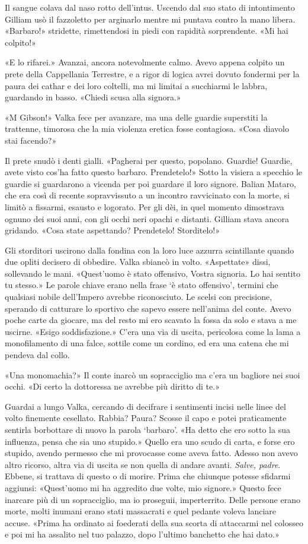 Il sangue colava dal naso rotto dell'intus. Uscendo dal suo stato di
intontimento Gilliam usò il fazzoletto per arginarlo mentre mi puntava
contro la mano libera. «Barbaro!» stridette, rimettendosi in piedi con
rapidità sorprendente. «Mi hai colpito!»

«E lo rifarei.» Avanzai, ancora notevolmente calmo. Avevo appena colpito
un prete della Cappellania Terrestre, e a rigor di logica avrei dovuto
fondermi per la paura dei cathar e dei loro coltelli, ma mi limitai a
succhiarmi le labbra, guardando in basso. «Chiedi scusa alla signora.»

«M Gibson!» Valka fece per avanzare, ma una delle guardie superstiti la
trattenne, timorosa che la mia violenza eretica fosse contagiosa. «Cosa
diavolo stai facendo?»

Il prete snudò i denti gialli. «Pagherai per questo, popolano. Guardie!
Guardie, avete visto cos'ha fatto questo barbaro. Prendetelo!» Sotto la
visiera a specchio le guardie si guardarono a vicenda per poi guardare
il loro signore. Balian Mataro, che era così di recente sopravvissuto a
un incontro ravvicinato con la morte, si limitò a fissarmi, esausto e
logorato. Per gli dèi, in quel momento dimostrava ognuno dei suoi anni,
con gli occhi neri opachi e distanti. Gilliam stava ancora gridando.
«Cosa state aspettando? Prendetelo! Storditelo!»

Gli storditori uscirono dalla fondina con la loro luce azzurra
scintillante quando due opliti decisero di obbedire. Valka sbiancò in
volto. «Aspettate» dissi, sollevando le mani. «Quest'uomo è stato
offensivo, Vostra signoria. Lo hai sentito tu stesso.» Le parole chiave
erano nella frase `è stato offensivo', termini che qualsiasi nobile
dell'Impero avrebbe riconosciuto. Le scelsi con precisione, sperando di
catturare lo sportivo che sapevo essere nell'anima del conte. Avevo
poche carte da giocare, ma del resto mi ero scavato la fossa da solo e
stava a me uscirne. «Esigo soddisfazione.» C'era una via di uscita,
pericolosa come la lama a monofilamento di una falce, sottile come un
cordino, ed era una catena che mi pendeva dal collo.

«Una monomachia?» Il conte inarcò un sopracciglio ma c'era un bagliore
nei suoi occhi. «Di certo la dottoressa ne avrebbe più diritto di te.»

Guardai a lungo Valka, cercando di decifrare i sentimenti incisi nelle
linee del volto finemente cesellato. Rabbia? Paura? Scosse il capo e
potei praticamente sentirla borbottare di nuovo la parola `barbaro'. «Ha
detto che ero sotto la sua influenza, pensa che sia uno stupido.» Quello
era uno scudo di carta, e forse ero stupido, avendo permesso che mi
provocasse come aveva fatto. Adesso non avevo altro ricorso, altra via
di uscita se non quella di andare avanti. \emph{Salve, padre}. Ebbene,
si trattava di questo o di morire. Prima che chiunque potesse sfidarmi
aggiunsi: «Quest'uomo mi ha aggredito due volte, mio signore.» Questo
fece inarcare più di un sopracciglio, ma io proseguii, imperterrito.
Delle persone erano morte, molti inumani erano stati massacrati e quel
pedante voleva lanciare accuse. «Prima ha ordinato ai foederati della
sua scorta di attaccarmi nel colosseo e poi mi ha assalito nel tuo
palazzo, dopo l'ultimo banchetto che hai dato.»

